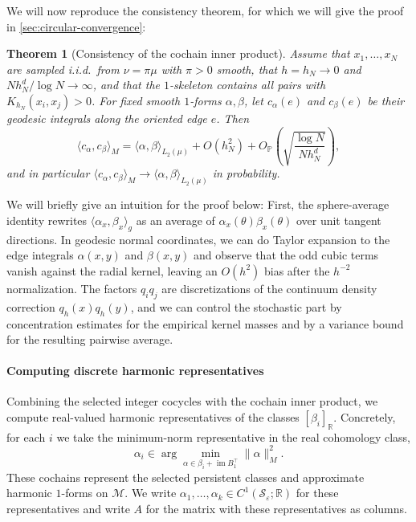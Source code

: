 \documentclass[a4paper,11pt, DIV=10]{scrartcl}
\numberwithin{equation}{section}
\newtheorem{theorem}{Theorem}[section]
\theoremstyle{definition}
\theoremstyle{remark}
\newcommand{\R}{\mathbb{R}}
\newcommand{\mc}[1]{\mathcal{#1}}
\begin{document}
We will now reproduce the consistency theorem, for which we will give the proof in \cref{sec:circular-convergence}:
\begin{theorem}[Consistency of the cochain inner product]
\label{thm:cochain-inner-product-consistency-main-text}
Assume that $x_1,\dots,x_N$ are sampled i.i.d.\ from $\nu=\pi\mu$ with $\pi>0$ smooth, that $h=h_N\to 0$ and $Nh_N^d/\log N\to\infty$, and that the $1$-skeleton contains all pairs with $K_{h_N}(x_i,x_j)>0$.
For fixed smooth $1$-forms $\alpha,\beta$, let $c_\alpha(e)$ and $c_\beta(e)$ be their geodesic integrals along the oriented edge $e$.
Then
\begin{equation}
\label{eq:discrete-inner-product-consistency-main-text}
\langle c_\alpha,c_\beta\rangle_M
=
\langle \alpha,\beta\rangle_{L_2(\mu)}
+ O(h_N^2)
+ O_{\mathbb P}\!\left(\sqrt{\frac{\log N}{N h_N^d}}\right),
\end{equation}
and in particular $\langle c_\alpha,c_\beta\rangle_M\to \langle \alpha,\beta\rangle_{L_2(\mu)}$ in probability.
\end{theorem}
We will briefly give an intuition for the proof below:
First, the sphere-average identity rewrites $\langle \alpha_x,\beta_x\rangle_g$ as an average of $\alpha_x(\theta)\beta_x(\theta)$ over unit tangent directions.
In geodesic normal coordinates, we can do Taylor expansion to the edge integrals $\alpha(x,y)$ and $\beta(x,y)$ and observe that the odd cubic terms vanish against the radial kernel, leaving an $O(h^2)$ bias after the $h^{-2}$ normalization.
The factors $q_iq_j$ are discretizations of the continuum density correction $q_h(x)q_h(y)$, and we can control the stochastic part by concentration estimates for the empirical kernel masses and by a variance bound for the resulting pairwise average.

\paragraph{Computing discrete harmonic representatives}
Combining the selected integer cocycles with the cochain inner product, we compute real-valued harmonic representatives of the classes $[\beta_i]_\R$.
Concretely, for each $i$ we take the minimum-norm representative in the real cohomology class,
\begin{equation}
\alpha_i
\in
\arg\min_{\alpha\in \beta_i+\operatorname{im} B_1^\top}
\lVert \alpha\rVert_M^2.
\end{equation}
These cochains represent the selected persistent classes and approximate harmonic $1$-forms on $\mc{M}$.
We write $\alpha_1,\dots,\alpha_k\in C^1(\mc{S}_\varepsilon;\R)$ for these representatives and write $A$ for the matrix with these representatives as columns.
\end{document}
